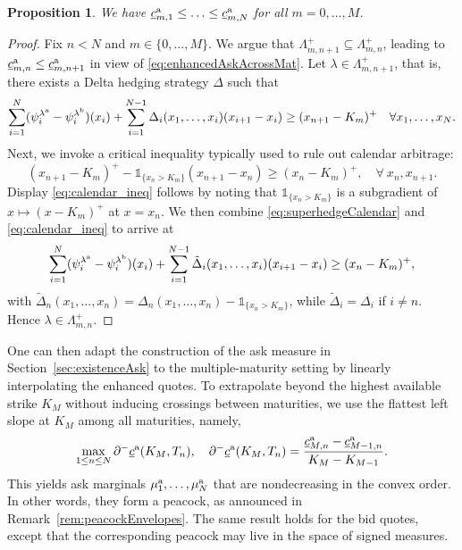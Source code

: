 \documentclass[11pt]{article}
\theoremstyle{plain}
\newtheorem{proposition}[theorem]{Proposition}
\theoremstyle{definition}
\theoremstyle{remark}
\theoremstyle{plain}
\begin{document}
\begin{proposition}
    We have %
    $\underline{c}^{\rm a}_{m,1}\le \ldots \le \underline{c}^{\rm a}_{m,N}$ for all $m = 0,\ldots, M$. 
\end{proposition}
\begin{proof} Fix $n<N$ and $m\in \{0,\ldots,M\}$. We argue that $\Lambda_{m,n+1}^{+} \subseteq \Lambda_{m,n}^{+}$, leading to $\underline{c}^{\rm a}_{m,n} \le \underline{c}^{\rm a}_{m,n+1}$ in view of \eqref{eq:enhancedAskAcrossMat}.
Let $\lambda \in \Lambda_{m,n+1}^{+}$, that is, there exists a Delta hedging strategy  $\Delta$ such that 
    \begin{equation} \label{eq:superhedgeCalendar}
\sum_{i=1}^N (\psi_{i}^{\lambda^{\rm a}} - \psi_{i}^{\lambda^{\rm b}})(x_i) + \sum_{i=1}^{N-1} \Delta_i(x_1,\ldots,x_i)(x_{i+1} - x_i) \ge (x_{n+1}- K_m)^+\quad  \forall x_1,\ldots, x_N.
\end{equation}
   Next, we invoke a critical inequality typically used to rule out  calendar arbitrage: 
    \begin{equation} \label{eq:calendar_ineq}
(x_{n+1} - K_m)^+ -\mathds{1}_{\{x_n > K_m\}}(x_{n+1} - x_n) \ge    (x_n - K_m)^+, \quad \forall \ x_n, x_{n+1}. 
\end{equation}
Display \eqref{eq:calendar_ineq} %
follows by noting that $\mathds{1}_{\{x_n>K_m\}}$ is a subgradient of  $x\mapsto (x-K_m)^+$ at $x = x_n$. 
%
We then combine %
\eqref{eq:superhedgeCalendar} and   \eqref{eq:calendar_ineq} to arrive at 
$$\sum_{i=1}^N (\psi_{i}^{\lambda^{\rm a}} - \psi_{i}^{\lambda^{\rm b}})(x_i) + \sum_{i=1}^{N-1} \tilde{\Delta}_i(x_1,\ldots,x_i)(x_{i+1} - x_i) \ge (x_{n}- K_m)^+, $$
with $\tilde{\Delta}_n(x_1,\ldots,x_n) = \Delta_n(x_1,\ldots,x_n) - \mathds{1}_{\{x_n > K_m\}}$,  while $\tilde{\Delta}_i = \Delta_i$ if $i\ne n$. Hence $\lambda \in \Lambda_{m,n}^{+}$. 
\end{proof}

One can then adapt the construction of the ask measure in Section~\ref{sec:existenceAsk} to the multiple-maturity setting by linearly interpolating the enhanced quotes. To extrapolate beyond the highest available strike $K_M$ without inducing crossings between maturities, we use the flattest left slope  at $K_M$ among all maturities, namely, 
$$\max_{1 \le n \le N} \partial^-\underline{c}^{\rm a}(K_M,T_n), \quad \partial^-\underline{c}^{\rm a}(K_M,T_n) = \frac{\underline{c}_{M,n}^{\rm a}-\underline{c}_{M-1,n}^{\rm a}}{K_M-K_{M-1}}. $$ This yields ask marginals $\mu_1^{\rm a}, \ldots, \mu_N^{\rm a}$ that are nondecreasing in the convex order. In other words, they form a peacock, as announced in Remark~\ref{rem:peacockEnvelopes}. The same result holds for the bid quotes, except that the corresponding peacock may live in the space of signed measures.
\end{document}
